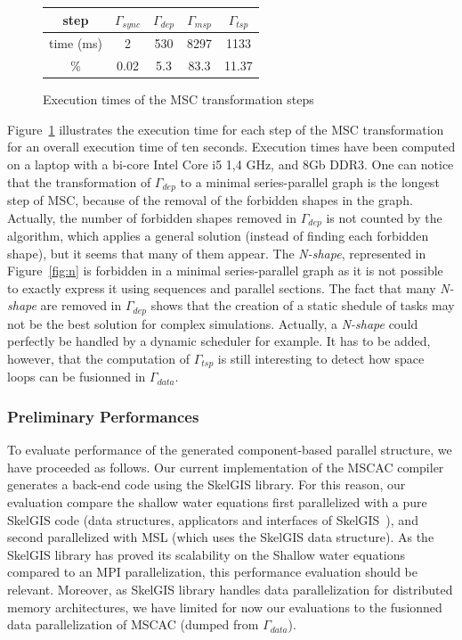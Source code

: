 \begin{figure}[!h]
 \begin{center}
 \begin{tabular}{c|c|c|c|c|}
   step & $\Gamma_{sync}$ & $\Gamma_{dep}$ & $\Gamma_{msp}$ & $\Gamma_{tsp}$\\
   \hline
   time (ms) & 2 & 530 & 8297 & 1133\\
   \hline
   \% & 0.02 & 5.3 & 83.3 & 11.37\\
 \end{tabular}
\caption{Execution times of the MSC transformation steps}
\label{fig:exectime}
 \end{center}
\end{figure}

Figure~\ref{fig:exectime} illustrates the execution time for each step of the MSC transformation for an overall execution time of ten seconds. Execution times have been computed on a laptop with a bi-core Intel Core i5 1,4 GHz, and 8Gb DDR3. 
One can notice that the transformation of $\Gamma_{dep}$ to a minimal series-parallel graph is the longest step of MSC, because of the removal of the forbidden shapes in the graph. Actually, the number of forbidden shapes removed in $\Gamma_{dep}$ is not counted by the algorithm, which applies a general solution (instead of finding each forbidden shape), but it seems that many of them appear. The \emph{N-shape}, represented in Figure~\ref{fig:n} is forbidden in a minimal series-parallel graph as it is not possible to exactly express it using sequences and parallel sections.
The fact that many \emph{N-shape} are removed in $\Gamma_{dep}$ shows that the creation of a static shedule of tasks may not be the best solution for complex simulations. Actually, a \emph{N-shape} could perfectly be handled by a dynamic scheduler for example. It has to be added, however, that the computation of $\Gamma_{tsp}$ is still interesting to detect how space loops can be fusionned in $\Gamma_{data}$.

\subsubsection*{Preliminary Performances}
To evaluate performance of the generated component-based parallel structure, we have proceeded as follows. Our current implementation of the MSCAC compiler generates a back-end code using the SkelGIS library. For this reason, our evaluation compare the shallow water equations first parallelized with a pure SkelGIS code (data structures, applicators and interfaces of SkelGIS~\cite{CPE:CPE3494}), and second parallelized with MSL (which uses the SkelGIS data structure). As the SkelGIS library has proved its scalability on the Shallow water equations compared to an MPI parallelization, this performance evaluation should be relevant. 
Moreover, as SkelGIS library handles data parallelization for distributed memory architectures, we have limited for now our evaluations to the fusionned data parallelization of MSCAC (dumped from $\Gamma_{data}$). 

